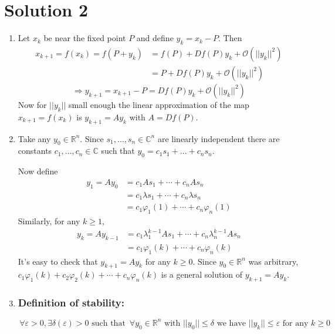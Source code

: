\documentclass[twoside,10pt,a4paper]{article}
\begin{document}
\section*{Solution 2}
\begin{enumerate}[label=(\alph*)]
\item Let $x_k$ be near the fixed point $P$ and define $y_k = x_k - P$. Then
\begin{align*}
	x_{k+1} = f(x_k) = f(P + y_k) &= f(P) + Df(P)y_k + \mathcal{O}(||y_k||^2) \\
	&= P + Df(P)y_k + \mathcal{O}(||y_k||^2)
\end{align*}
\begin{equation*}
	\Longrightarrow y_{k+1} = x_{k+1} - P = Df(P)y_k + \mathcal{O}(||y_k||^2)
\end{equation*}
Now for $||y_k||$ small enough the linear approximation of the map $x_{k+1} = f(x_k)$ is $y_{k+1} = Ay_k$ with $A = Df(P)$.


\item Take any $y_0 \in \mathbb{R}^n$. Since $s_1,\ldots ,s_n \in \mathbb{C}^n$ are linearly independent there are constants $c_1,\ldots ,c_n \in \mathbb{C}$ such that $y_0 = c_1s_1+\ldots+c_ns_n$.

Now define
\begin{align*}
	y_1 = Ay_0 &= c_1As_1 + \cdots + c_nAs_n \\
	&= c_1\lambda s_1 + \cdots + c_n\lambda s_n \\
	&= c_1\varphi_1(1) + \cdots + c_n \varphi_n(1)
\end{align*}
Similarly, for any $k \geq 1$,
\begin{align}
	y_k = Ay_{k-1} &= c_1 \lambda_1^{k-1}As_1 + \cdots + c_n \lambda_n^{k-1}As_n \nonumber \\
	&= c_1\varphi_1(k) + \cdots + c_n \varphi_n(k)
\end{align}
It's easy to check that $y_{k+1} = Ay_k$ for any $k \geq 0$. Since $y_0 \in \mathbb{R}^n$ was arbitrary, $c_1\varphi_1(k)+c_2\varphi_2(k) + \cdots + c_n\varphi_n(k)$ is a general solution of $y_{k+1} = Ay_k$.


\item \subsubsection*{Definition of stability:}
\begin{equation*}
	\,\forall \varepsilon > 0, \exists \delta(\varepsilon)>0 \text{ such that } \,\forall y_0\in\mathbb{R}^n \text{ with } ||y_0|| \leq \delta \text{ we have } ||y_k|| \leq \varepsilon \text{ for any } k \geq 0
\end{equation*}


\end{enumerate}
\end{document}
